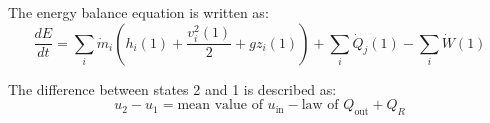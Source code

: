 The energy balance equation is written as:  
\[
\frac{dE}{dt} = \sum_i \dot{m}_i \left( h_i(1) + \frac{v_i^2(1)}{2} + g z_i(1) \right) + \sum_i \dot{Q}_j(1) - \sum_i \dot{W}(1)
\]  

The difference between states 2 and 1 is described as:  
\[
u_2 - u_1 = \text{mean value of } u_{\text{in}} - \text{law of } Q_{\text{out}} + Q_R
\]